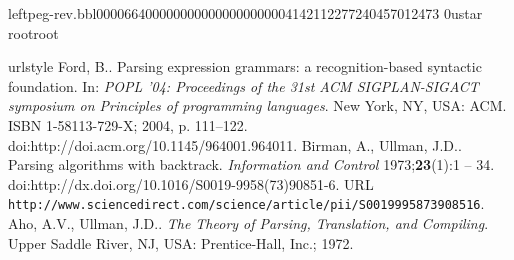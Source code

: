 leftpeg-rev.bbl                                                                                     0000664 0000000 0000000 00000041421 12277240457 012473  0                                                                                                    ustar   root                            root                                                                                                                                                                                                                   \begin{thebibliography}{35}
\providecommand{\natexlab}[1]{#1}
\providecommand{\url}[1]{\texttt{#1}}
\providecommand{\urlprefix}{URL }
\expandafter\ifx\csname urlstyle\endcsname\relax
  \providecommand{\doi}[1]{doi:\discretionary{}{}{}#1}\else
  \providecommand{\doi}{doi:\discretionary{}{}{}\begingroup
  \urlstyle{rm}\Url}\fi
\providecommand{\eprint}[2][]{\url{#2}}
\providecommand{\bibinfo}[2]{#2}
\ifx\xfnm\undefined \def\xfnm[#1]{\unskip,\space#1}\fi
\makeatletter\def\@biblabel#1{#1.}\makeatother
\bibinfo{author}{Ford\xfnm[ B.]}.
\newblock \bibinfo{title}{Parsing expression grammars: a recognition-based
  syntactic foundation}.
\newblock In: \emph{\bibinfo{booktitle}{POPL '04: Proceedings of the 31st ACM
  SIGPLAN-SIGACT symposium on Principles of programming languages}}.
  \bibinfo{address}{New York, NY, USA}: \bibinfo{publisher}{ACM}.
\newblock ISBN \bibinfo{isbn}{1-58113-729-X}; \bibinfo{year}{2004},
  \hspace{0pt}p. \bibinfo{pages}{111--122}.
\newblock \doi{\bibinfo{doi}{http://doi.acm.org/10.1145/964001.964011}}.
\bibinfo{author}{Birman\xfnm[ A.]}, \bibinfo{author}{Ullman\xfnm[ J.D.]}.
\newblock \bibinfo{title}{Parsing algorithms with backtrack}.
\newblock \emph{\bibinfo{journal}{Information and Control}}
  \bibinfo{year}{1973};\hspace{0pt}\textbf{\bibinfo{volume}{23}}(\bibinfo{number}{1}):\bibinfo{pages}{1
  -- 34}.
\newblock \doi{\bibinfo{doi}{http://dx.doi.org/10.1016/S0019-9958(73)90851-6}}.
\newblock
  \urlprefix\url{http://www.sciencedirect.com/science/article/pii/S0019995873908516}.
\bibinfo{author}{Aho\xfnm[ A.V.]}, \bibinfo{author}{Ullman\xfnm[ J.D.]}.
\newblock \emph{\bibinfo{title}{The Theory of Parsing, Translation, and
  Compiling}}.
\newblock \bibinfo{address}{Upper Saddle River, NJ, USA}:
  \bibinfo{publisher}{Prentice-Hall, Inc.}; \bibinfo{year}{1972}.

\end{thebibliography}

